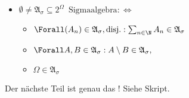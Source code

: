 \begin{solution}
\begin{itemize}
  \item $\emptyset \neq \mathfrak{A}_\sigma \subseteq 2^\Omega \enspace \text{Sigmaalgebra} : \Leftrightarrow$
  \begin{itemize}
    \item $\Forall (A_n) \in \mathfrak{A}_\sigma, \text{disj.}: \sum_{n \in \N} A_n \in \mathfrak{A}_\sigma$
    \item $\Forall A, B \in \mathfrak{A}_\sigma: A \setminus B \in \mathfrak{A}_\sigma,$
    \item $\Omega \in \mathfrak{A}_\sigma$
  \end{itemize}

\end{itemize}

Der nächste Teil ist genau das ! Siehe Skript.

\end{solution}

